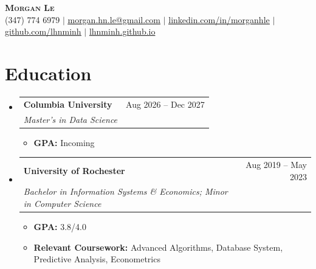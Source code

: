 \documentclass[a4paper,11pt]{article}
\makeatletter
\newcommand{\resumeItem}[1]{
  \item\small{
    {#1 \vspace{-2pt}}
  }
}
\newcommand{\resumeSubheading}[4]{
  \vspace{-2pt}\item
    \begin{tabular*}{0.97\textwidth}[t]{l@{\extracolsep{\fill}}r}
      \textbf{#1} & #2 \\
      \textit{\small#3} & \textit{\small #4} \\
    \end{tabular*}\vspace{-7pt}
}
\newcommand{\resumeSubHeadingListStart}{\begin{itemize}[leftmargin=0.15in, label={}]}
\newcommand{\resumeSubHeadingListEnd}{\end{itemize}}
\newcommand{\resumeItemListStart}{\begin{itemize}}
\newcommand{\resumeItemListEnd}{\end{itemize}\vspace{-5pt}}
\makeatother
\begin{document}
\begin{center}
  \textbf{\Huge \scshape Morgan Le} \\ \vspace{1pt}
  \small (347) 774 6979 $|$
  \href{mailto:morgan.hn.le@gmail.com}{\underline{morgan.hn.le@gmail.com}} $|$
  \href{https://www.linkedin.com/in/morganhle/}{\underline{linkedin.com/in/morganhle}} $|$
  \href{https://github.com/lhnminh}{\underline{github.com/lhnminh}} $|$
  \href{https://lhnminh.github.io/}{lhnminh.github.io}
\end{center}

\section{Education}
\resumeSubHeadingListStart
  \resumeSubheading
    {Columbia University}{Aug 2026 -- Dec 2027}
    {Master's in Data Science}{}
    \resumeItemListStart
      \resumeItem{{\bfseries GPA:} Incoming}
    \resumeItemListEnd
  \resumeSubheading
    {University of Rochester}{Aug 2019 -- May 2023}
    {Bachelor in Information Systems \& Economics; Minor in Computer Science}{}
    \resumeItemListStart
      \resumeItem{{\bfseries GPA:} 3.8/4.0}
      \resumeItem{{\bfseries Relevant Coursework:} Advanced Algorithms, Database System, Predictive Analysis, Econometrics}
    \resumeItemListEnd
\resumeSubHeadingListEnd
\end{document}
